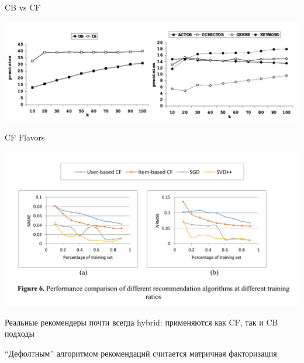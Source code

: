 \documentclass[11pt,aspectratio=169]{beamer}
\begin{document}
\begin{frame}{CB vs CF}

\begin{center}
\includegraphics[scale=0.5]{images/comparison2.png}
\end{center}

\end{frame}

\begin{frame}{CF Flavors}

\begin{center}
\includegraphics[scale=0.5]{images/comparison.png}
\end{center}

\end{frame}

\begin{frame}

\begin{tcolorbox}[colback=info!5,colframe=info!80,title=]
Реальные рекомендеры почти всегда hybrid: применяются как CF, так и CB подходы
\end{tcolorbox}

\begin{tcolorbox}[colback=info!5,colframe=info!80,title=]
``Дефолтным'' алгоритмом рекомендаций считается матричная факторизация
\end{tcolorbox}

\end{frame}
\end{document}
